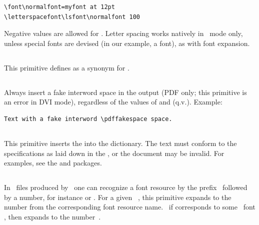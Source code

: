 \documentclass{pdftexmanual}
\begin{document}
\begin{verbatim}
\font\normalfont=myfont at 12pt
\letterspacefont\lsfont\normalfont 100
\end{verbatim}

Negative values are allowed for .
Letter spacing works natively in \PDF\ mode only, unless special fonts are
devised (in our example, a  font), as with font expansion.

\subsection{}

This primitive defines  as a synonym for
.

\subsection{}

Always insert a fake interword space in the output (PDF only; this
primitive is an error in DVI mode), regardless of the values of
 and  (q.v.). Example:

\begin{verbatim}
Text with a fake interword \pdffakespace space.
\end{verbatim}

\subsection{}

This primitive inserts the  into the
 dictionary. The text must conform to the specifications as
laid down in the \PDFReference, or the document may be invalid. For
examples, see the  and  packages.

\subsection{}

In \PDF\ files produced by \PDFTEX\ one can recognize a font resource
by the prefix~ followed by a number, for instance 
or .  For a given \TEX\ , this primitive
expands to the number from the corresponding font resource name.
\Eg\ if  corresponds to some \TEX\ font , then
 expands to the number~.
\end{document}
